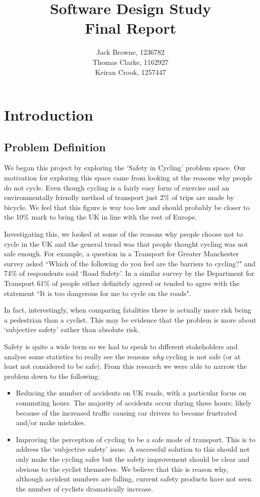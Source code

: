 \documentclass[a4paper]{report}
\title{Software Design Study\\Final Report}
\author{Jack Browne, 1236782\\Thomas Clarke, 1162927\\Keiran Crook, 1257447}
\begin{document}
\maketitle

\tableofcontents

\chapter{Introduction}
\section{Problem Definition}
We began this project by exploring the `Safety in Cycling' problem space. Our motivation for exploring this space came from looking at the reasons why people do not cycle. Even though cycling is a fairly easy form of exercise and an environmentally friendly method of transport just 2\% of trips are made by bicycle\cite{travelsurvey}. We feel that this figure is way too low and should probably be closer to the 10\% mark to bring the UK in line with the rest of Europe.

Investigating this, we looked at some of the reasons why people choose not to cycle in the UK and the general trend was that people thought cycling was not safe enough. For example, a question in a Transport for Greater Manchester survey asked ``Which of the following do you feel are the barriers to cycling?" and 74\% of respondents said `Road Safety'\cite{TfGM}. In a similar survey by the Department for Transport 61\% of people either definitely agreed or tended to agree with the statement ``It is too dangerous for me to cycle on the roads"\cite{dft}.

In fact, interestingly, when comparing fatalities there is actually more risk being a pedestrian than a cyclist. This may be evidence that the problem is more about `subjective safety' rather than absolute risk. 

Safety is quite a wide term so we had to speak to different stakeholders and analyse some statistics to really see the reasons \textit{why} cycling is not safe (or at least not considered to be safe). From this research we were able to narrow the problem down to the following:

\begin{itemize}
  \item Reducing the number of accidents on UK roads, with a particular focus on commuting hours. The majority of accidents occur during these hours; likely because of the increased traffic causing car drivers to become frustrated and/or make mistakes. 
  \item Improving the perception of cycling to be a safe mode of transport. This is to address the `subjective safety' issue. A successful solution to this should not only make the cycling safer but the safety improvement should be clear and obvious to the cyclist themselves. We believe that this is reason why, although accident numbers are falling, current safety products have not seen the number of cyclists dramatically increase.
\end{itemize}
\end{document}
